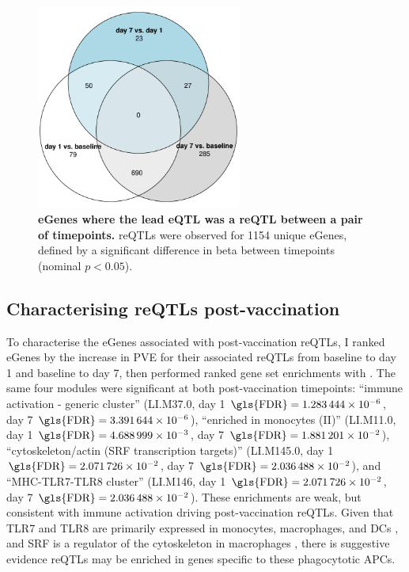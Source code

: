 \begin{figure}
    \centering
    \includegraphics[width=0.6\textwidth]{mainmatter/figures/chapter_03/compare_dge_eqtl.pairwise_reQTL_venn.pdf}
    \caption{
        \textbf{eGenes where the lead \gls{eQTL} was a \gls{reQTL} between a pair of timepoints.}
        \glspl{reQTL} were observed for 1154 unique eGenes, 
        defined by a significant difference in beta between timepoints (nominal $p < 0.05$).
    }
    \label{fig:hird_reQTL_pairwise_venn}
\end{figure}

\subsection{Characterising reQTLs post-vaccination}

To characterise the eGenes associated with post-vaccination \glspl{reQTL},
I ranked eGenes by the increase in \gls{PVE} for their associated \glspl{reQTL} from baseline to day 1 and baseline to day 7,
then performed ranked gene set enrichments with  \autocite{weiner3rd2016TmodPackageGeneral}.
%
%
The same four modules were significant at both post-vaccination timepoints:
\enquote{immune activation - generic cluster} (LI.M37.0, day 1 $\text{\gls{FDR}} = \num{1.283444e-06}$, day 7 $\text{\gls{FDR}} = \num{3.391644e-06}$),
\enquote{enriched in monocytes (II)} (LI.M11.0, day 1 $\text{\gls{FDR}} = \num{4.688999e-03}$, day 7 $\text{\gls{FDR}} = \num{1.881201e-02}$),
\enquote{cytoskeleton/actin (SRF transcription targets)} (LI.M145.0, day 1 $\text{\gls{FDR}} = \num{2.071726e-02}$, day 7 $\text{\gls{FDR}} = \num{2.036488e-02}$),
and \enquote{MHC-TLR7-TLR8 cluster} (LI.M146, day 1 $\text{\gls{FDR}} = \num{2.071726e-02}$, day 7 $\text{\gls{FDR}} = \num{2.036488e-02}$).
These enrichments are weak, but consistent with immune activation driving post-vaccination \glspl{reQTL}.
Given that TLR7 and TLR8 are primarily expressed in monocytes, macrophages, and \glspl{DC} \autocite{cervantes2012TLR8ForgottenRelative},
and SRF is a regulator of the cytoskeleton in macrophages \autocite{sullivan2011SerumResponseFactor}, 
there is suggestive evidence \glspl{reQTL} may be enriched in genes specific to these phagocytotic \glspl{APC}.

